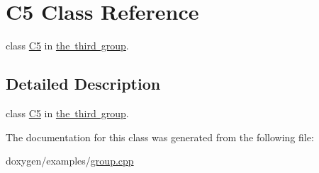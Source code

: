 \hypertarget{class_c5}{}\section{C5 Class Reference}
\label{class_c5}


class \mbox{\hyperlink{class_c5}{C5}} in \mbox{\hyperlink{group__group3}{the third group}}.  




\subsection{Detailed Description}
class \mbox{\hyperlink{class_c5}{C5}} in \mbox{\hyperlink{group__group3}{the third group}}. 

The documentation for this class was generated from the following file\+:\begin{DoxyCompactItemize}
\item 
doxygen/examples/\mbox{\hyperlink{group_8cpp}{group.\+cpp}}\end{DoxyCompactItemize}
